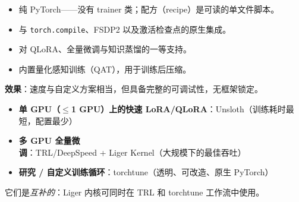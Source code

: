 \begin{itemize}
  \item 纯 PyTorch——没有 trainer 类；配方（recipe）是可读的单文件脚本。
  \item 与 \texttt{torch.compile}、FSDP2 以及激活检查点的原生集成。
  \item 对 QLoRA、全量微调与知识蒸馏的一等支持。
  \item 内置量化感知训练（QAT），用于训练后压缩。
\end{itemize}

\textbf{效果}：速度与自定义方案相当，但具备完整的可调试性，无框架锁定。

\begin{keybox}[选择效率栈]
\begin{itemize}
  \item \textbf{单 GPU（$\leq$1 GPU）上的快速 LoRA/QLoRA}：Unsloth（训练耗时最短，配置最少）
  \item \textbf{多 GPU 全量微调}：TRL/DeepSpeed + Liger Kernel（大规模下的最佳吞吐）
  \item \textbf{研究 / 自定义训练循环}：torchtune（透明、可改造、原生 PyTorch）
\end{itemize}

它们是\emph{互补的}：Liger 内核可同时在 TRL 和 torchtune 工作流中使用。
\end{keybox}


